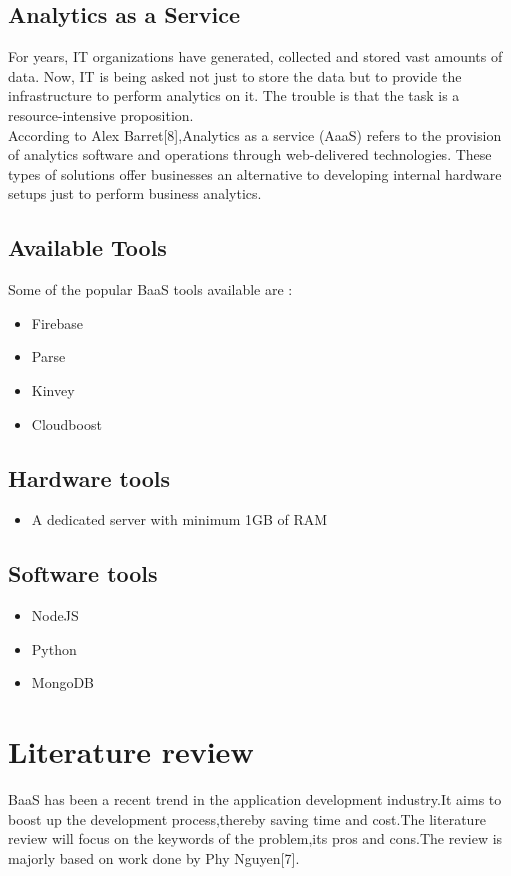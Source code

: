 \documentclass[a4paper,12pt]{report}
\begin{document}
    \subsection{Analytics as a Service}    
    For years, IT organizations have generated, collected and stored vast amounts of data. Now, IT is being asked not just to store the data but to provide the infrastructure to perform analytics on it. The trouble is that the task is a resource-intensive proposition. \\    
    According to Alex Barret[8],Analytics as a service (AaaS) refers to the provision of analytics software and operations through web-delivered technologies. These types of solutions offer businesses an alternative to developing internal hardware setups just to perform business analytics. \\
    \subsection{Available Tools}
    Some of the popular BaaS tools available are :
    \begin{itemize}
    \item Firebase
    \item Parse
    \item Kinvey
    \item Cloudboost
    \end{itemize}
    
    \subsection{Hardware tools}    
    \begin{itemize}
    \item A dedicated server with minimum 1GB of RAM
    \end{itemize}

    \subsection{Software tools}    
    \begin{itemize}
    \item NodeJS     
    \item Python
    \item MongoDB
    \end{itemize}
            
    \section{Literature review}
    BaaS has been a recent trend in the application development industry.It aims to boost up the development process,thereby saving time and cost.The literature review will focus on the keywords of the problem,its pros and cons.The review is majorly based on work done by Phy Nguyen[7].
    
\end{document}
